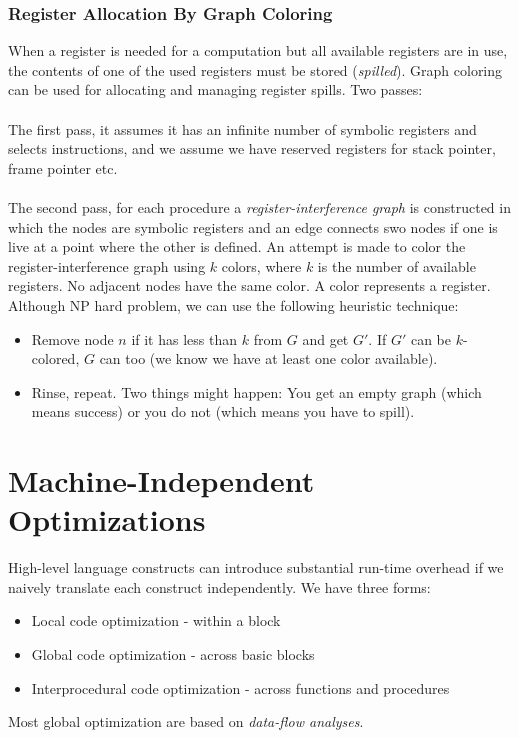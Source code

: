 \documentclass{article}
\begin{document}
\subsubsection{Register Allocation By Graph Coloring} %
\label{ssub:Register Allocation By Graph Coloring}
When a register is needed for a computation but all available registers are in use, the contents of one of the used registers must be stored (\emph{spilled}). Graph coloring can be used for allocating and managing register spills. Two passes:\\
\\
The first pass, it assumes it has an infinite number of symbolic registers and selects instructions, and we assume we have reserved registers for stack pointer, frame pointer etc. \\
\\
The second pass, for each procedure a \emph{register-interference graph} is constructed in which the nodes are symbolic registers and an edge connects swo nodes if one is live at a point where the other is defined. An attempt is made to color the register-interference graph using $k$ colors, where $k$ is the number of available registers. No adjacent nodes have the same color. A color represents a register. Although NP hard problem, we can use the following heuristic technique:
\begin{itemize}
	\item Remove node $n$ if it has less than $k$ from $G$ and get $G'$. If $G'$ can be $k$-colored, $G$ can too (we know we have at least one color available).
	\item Rinse, repeat. Two things might happen: You get an empty graph (which means success) or you do not (which means you have to spill).
\end{itemize}



\section{Machine-Independent Optimizations} %
\label{sec:Machine-Independent Optimizations}
High-level language constructs can introduce substantial run-time overhead if we naively translate each construct independently. We have three forms:
\begin{itemize}
	\item Local code optimization - within a block
	\item Global code optimization - across basic blocks
	\item Interprocedural code optimization - across functions and procedures
\end{itemize}
Most global optimization are based on \emph{data-flow analyses}.
\end{document}
